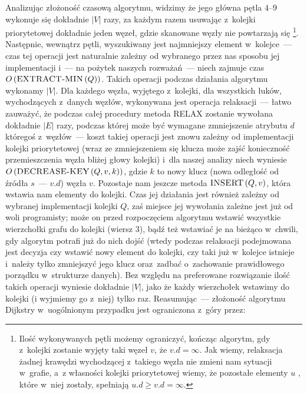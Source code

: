 Analizując złożoność czasową algorytmu, widzimy że jego główna pętla $4$--$9$ wykonuje się dokładnie $ \left| V \right| $ razy, za każdym razem usuwając z~kolejki priorytetowej dokładnie jeden węzeł, gdzie skanowane węzły nie powtarzają się \footnote{Ilość wykonywanych pętli możemy ograniczyć, kończąc algorytm, gdy z~kolejki zostanie wyjęty taki węzeł $v$, że $v.d = \infty$. Jak wiemy, relaksacja żadnej krawędzi wychodzącej z~takiego węzła nie zmieni nam sytuacji w~grafie, a~z własności kolejki priorytetowej wiemy, że pozostałe elementy $u$ , które w~niej zostały, spełniają $u.d \geqslant v.d = \infty$.}. Następnie, wewnątrz pętli, wyszukiwany jest najmniejszy element w~kolejce~--- czas tej operacji jest naturalnie zależny od wybranego przez nas sposobu jej implementacji i~--- na pożytek naszych rozważań~--- niech zajmuje czas $O \left( \textrm{\textsc{EXTRACT-MIN}} \left( Q \right) \right)$. Takich operacji podczas działania algorytmu wykonamy $ \left| V \right| $. Dla każdego węzła, wyjętego z~kolejki, dla wszystkich łuków, wychodzących z~danych węzłów, wykonywana jest operacja relaksacji~--- łatwo zauważyć, że podczas całej procedury metoda \textsc{RELAX} zostanie wywołana dokładnie $ \left| E \right|$ razy, podczas której może być wymagane zmniejszenie atrybutu $d$ któregoś z~węzłów~--- koszt takiej operacji jest znowu zależny od implementacji kolejki priorytetowej (wraz ze zmniejszeniem się klucza może zajść konieczność przemieszczenia węzła bliżej głowy kolejki) i~dla naszej analizy niech wyniesie $O \left( \textrm{\textsc{DECREASE-KEY}} \left( Q, v, k \right) \right)$, gdzie $k$ to nowy klucz (nowa odległość od źródła $s$~--- $v.d$) węzła $v$. Pozostaje nam jeszcze metoda $\textrm{\textsc{INSERT}} \left( Q, v \right)$, która wstawia nam elementy do kolejki. Czas jej działania jest również zależny od wybranej implementacji kolejki $Q$, zaś miejsce jej wywołania zależne jest już od woli programisty; może on przed rozpoczęciem algorytmu wstawić wszystkie wierzchołki grafu do kolejki (wiersz $3$), bądź też wstawiać je na bieżąco w~chwili, gdy algorytm potrafi już do nich dojść (wtedy podczas relaksacji podejmowana jest decyzja czy wstawić nowy element do kolejki, czy taki już w~kolejce istnieje i~należy tylko zmniejszyć jego klucz oraz~zadbać o~zachowanie prawidłowego porządku w~strukturze danych). Bez względu na preferowane rozwiązanie ilość takich operacji wyniesie dokładnie $ \left| V\right|$, jako że każdy wierzchołek wstawimy do kolejki (i wyjmiemy go z~niej) tylko raz. Reasumując~--- złożoność algorytmu Dijkstry w~uogólnionym przypadku jest ograniczona z~góry przez:

